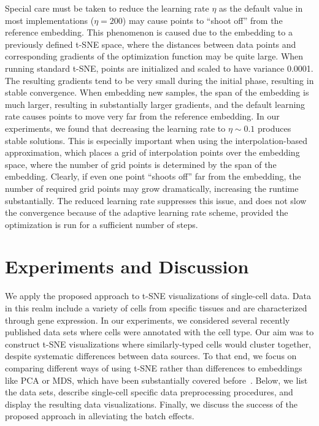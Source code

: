 \documentclass[runningheads]{llncs}
\begin{document}
Special care must be taken to reduce the learning rate $\eta$ as the default
value in most implementations ($\eta = 200$) may cause points to ``shoot off''
from the reference embedding. This phenomenon is caused due to the embedding to
a previously defined t-SNE space, where the distances between data points and
corresponding gradients of the optimization function may be quite large. When
running standard t-SNE, points are initialized and scaled to have variance
0.0001. The resulting gradients tend to be very small during the initial phase,
resulting in stable convergence. When embedding new samples, the span of the
embedding is much larger, resulting in substantially larger gradients, and the default
learning rate causes points to move very far from the reference embedding. In
our experiments, we found that decreasing the learning rate to $\eta \sim 0.1$
produces stable solutions. This is especially important when using the
interpolation-based approximation, which places a grid of interpolation
points over the embedding space, where the number of grid points is determined
by the span of the embedding. Clearly, if even one point ``shoots off'' far from the
embedding, the number of required grid points may grow dramatically,
increasing the runtime substantially. The reduced learning rate suppresses this issue, and
does not slow the convergence because of the adaptive learning rate scheme, provided
the optimization is run for a sufficient number of steps. 

\section{Experiments and Discussion}

We apply the proposed approach to t-SNE visualizations of
single-cell data. Data in this realm include a variety of
cells from specific tissues and are characterized through gene expression.
In our experiments, we considered several recently published data
sets where cells were annotated with the cell type. Our aim was to construct
t-SNE visualizations where similarly-typed cells would cluster together,
despite systematic differences between data sources. To that end, we focus
on comparing different ways of using t-SNE rather than differences to embeddings like PCA or MDS, which
have been substantially covered before~. 
Below, we list the data sets,
describe single-cell specific data preprocessing procedures, and display the
resulting data visualizations. Finally, we discuss the success of the proposed
approach in alleviating the batch effects.
\end{document}
